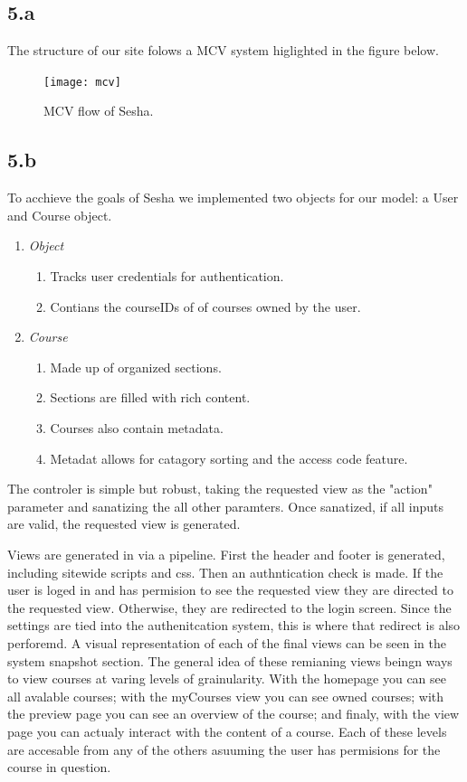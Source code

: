 \documentclass{article}
\begin{document}
\subsection{5.a}
    The structure of our site folows a MCV system higlighted in the figure below.
\begin{figure}[h!]
    \caption{MCV flow of Sesha.}
    \texttt{[image: mcv]}
\end{figure}
\subsection{5.b}
    To acchieve the goals of Sesha we implemented two objects for our model: a User and Course object.
    \begin{enumerate}
        \item \textit{Object}
            \begin{enumerate}
                \item Tracks user credentials for authentication.
                \item Contians the courseIDs of of courses owned by the user.
            \end{enumerate}
        \item \textit{Course}
            \begin{enumerate}
                \item Made up of organized sections.
                \item Sections are filled with rich content.
                \item Courses also contain metadata.
                \item Metadat allows for catagory sorting and the access code feature.
            \end{enumerate}
    \end{enumerate}
    The controler is simple but robust, taking the requested view as the "action" parameter and sanatizing the all other paramters. Once sanatized, if all inputs are valid, the requested view is generated.
    
    Views are generated in via a pipeline. First the header and footer is generated, including sitewide scripts and css. Then an authntication check is made. If the user is loged in and has permision to see the requested view they are directed to the requested view. Otherwise, they are redirected to the login screen. Since the settings are tied into the authenitcation system, this is where that redirect is also perforemd. A visual representation of each of the final views can be seen in the system snapshot section. The general idea of these remianing views beingn ways to view courses at varing levels of grainularity. With the homepage you can see all avalable courses; with the myCourses view you can see owned courses; with the preview page you can see an overview of the course; and finaly, with the view page you can actualy interact with the content of a course. Each of these levels are accesable from any of the others asuuming the user has permisions for the course in question.
\end{document}
